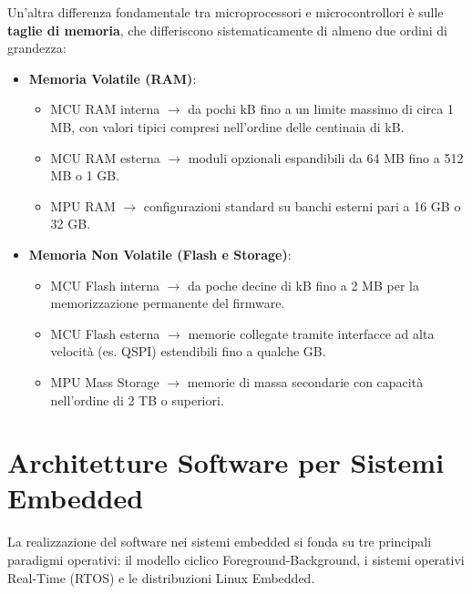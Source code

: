 Un'altra differenza fondamentale tra microprocessori e microcontrollori è sulle \textbf{taglie di memoria}, che differiscono sistematicamente di almeno due ordini di grandezza:
\begin{itemize}
    \item \textbf{Memoria Volatile (RAM)}:
    \begin{itemize}
        \item MCU RAM interna $\rightarrow$ da pochi kB fino a un limite massimo di circa 1 MB, con valori tipici compresi nell'ordine delle centinaia di kB.
        \item MCU RAM esterna $\rightarrow$ moduli opzionali espandibili da 64 MB fino a 512 MB o 1 GB.
        \item MPU RAM $\rightarrow$ configurazioni standard su banchi esterni pari a 16 GB o 32 GB.
    \end{itemize}
    \newpage
    \item \textbf{Memoria Non Volatile (Flash e Storage)}:
    \begin{itemize}
        \item MCU Flash interna $\rightarrow$ da poche decine di kB fino a 2 MB per la memorizzazione permanente del firmware.
        \item MCU Flash esterna $\rightarrow$ memorie collegate tramite interfacce ad alta velocità (es. QSPI) estendibili fino a qualche GB.
        \item MPU Mass Storage $\rightarrow$ memorie di massa secondarie con capacità nell'ordine di 2 TB o superiori.
    \end{itemize}
\end{itemize}

\section{Architetture Software per Sistemi Embedded}
La realizzazione del software nei sistemi embedded si fonda su tre principali paradigmi operativi: il modello ciclico Foreground-Background, i sistemi operativi Real-Time (RTOS) e le distribuzioni Linux Embedded.

